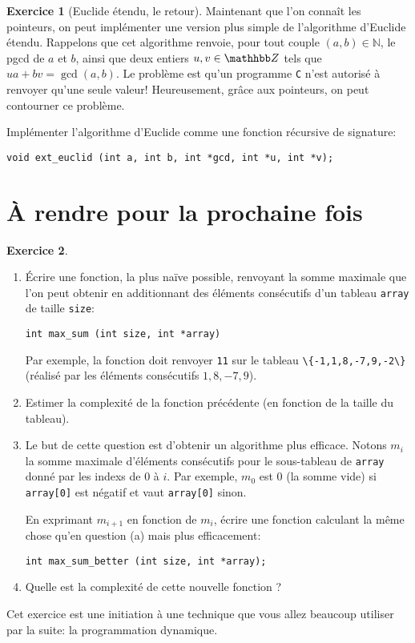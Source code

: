 \documentclass[french,a4paper]{article}
\theoremstyle{definition}
\newtheorem{exercise}{Exercice}
\theoremstyle{remark}
\newcommand{\inlinec}[1]{\lstinline[style=C]°#1°}
\begin{document}
\begin{exercise}[Euclide étendu, le retour]
  Maintenant que l'on connaît les pointeurs, on peut implémenter une
  version plus simple de l'algorithme d'Euclide étendu. Rappelons que
  cet algorithme renvoie, pour tout couple $(a,b) \in \mathbb N$, le
  pgcd de $a$ et $b$, ainsi que deux entiers $u,v \in \mathhbb Z$ tels
  que $ua+bv = \operatorname{gcd}(a,b)$. Le problème est qu'un
  programme {\tt C} n'est autorisé à renvoyer qu'une seule valeur!
  Heureusement, grâce aux pointeurs, on peut contourner ce problème.

  Implémenter l'algorithme d'Euclide comme une fonction récursive de
  signature:
  \begin{lstlisting}
void ext_euclid (int a, int b, int *gcd, int *u, int *v);    
  \end{lstlisting}
\end{exercise}

\section{\`A rendre pour la prochaine fois}
\label{sec:homeworks}

\begin{exercise}~
  \begin{enumerate}[label=(\roman*)]
  \item \'Ecrire une fonction, la plus naïve possible, renvoyant la
    somme maximale que l'on peut obtenir en additionnant des éléments
    consécutifs d'un tableau \inlinec{array} de taille \inlinec{size}:
    \begin{lstlisting}
int max_sum (int size, int *array)
    \end{lstlisting}
    Par exemple, la fonction doit renvoyer \inlinec{11} sur le tableau
    \inlinec{\{-1,1,8,-7,9,-2\}} (réalisé par les éléments consécutifs
    $1,8,-7,9$).
  \item Estimer la complexité de la fonction précédente (en fonction
    de la taille du tableau).
  \item Le but de cette question est d'obtenir un algorithme plus
    efficace. Notons $m_i$ la somme maximale d'éléments consécutifs
    pour le sous-tableau de \inlinec{array} donné par les indexs de
    $0$ à $i$. Par exemple, $m_0$ est $0$ (la somme vide) si
    \inlinec{array[0]} est négatif et vaut \inlinec{array[0]} sinon.

    En exprimant $m_{i+1}$ en fonction de $m_i$, écrire une fonction
    calculant la même chose qu'en question (a) mais plus efficacement:
    \begin{lstlisting}
int max_sum_better (int size, int *array);      
    \end{lstlisting}
  \item Quelle est la complexité de cette nouvelle fonction ?
  \end{enumerate}

  Cet exercice est une initiation à une technique que vous allez
  beaucoup utiliser par la suite: la programmation dynamique.
\end{exercise}
\end{document}
